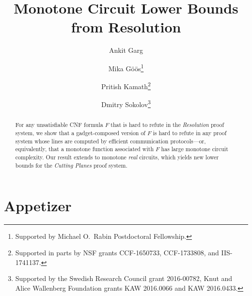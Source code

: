 \documentclass{toc}
\begin{document}
\begin{frontmatter}[classification=text]
  
%
\title{Monotone Circuit Lower Bounds\\ from Resolution}
%

%
%
%
%
%
%
%
%
%
%
%
%


%
%
%
%

%

\author[garg]{Ankit Garg}
\author[goos]{Mika G\"o\"os\thanks{Supported by Michael O.\ Rabin Postdoctoral Fellowship.}}
\author[kamath]{Pritish Kamath\thanks{Supported in parts by NSF grants CCF-1650733, CCF-1733808, and IIS-1741137.}}
\author[sokolov]{Dmitry Sokolov\thanks{Supported by the Swedish Research Council grant 2016-00782, Knut and Alice Wallenberg Foundation
grants KAW 2016.0066 and KAW 2016.0433.}}


%
%
%
%

%
%
%
%
%
%
\begin{abstract}
For any unsatisfiable CNF formula $F$ that is hard to refute in the \emph{Resolution} proof system, we show that a gadget-composed version of $F$ is hard to refute in any proof system whose lines are computed by efficient communication protocols---or, equivalently, that a monotone function associated with $F$ has large monotone circuit complexity. Our result extends to monotone \emph{real} circuits, which yields new lower bounds for the \emph{Cutting Planes} proof system.
\end{abstract}

%

\end{frontmatter}

%
%
%

\clearpage
\section{Appetizer} \label{sec:intro}
\end{document}
